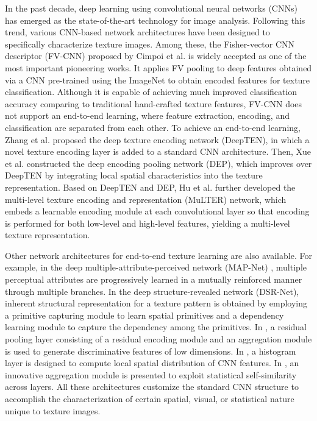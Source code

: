 \documentclass{aci}
\numberwithin{equation}{section}
\begin{document}
In the past decade, deep learning using convolutional neural networks (CNNs)
\cite{krizhevsky_imagenet_2017} has emerged as the state-of-the-art technology
for image analysis. Following this trend, various CNN-based network
architectures have been designed to specifically characterize texture images.
Among these, the Fisher-vector CNN descriptor (FV-CNN) proposed by Cimpoi et al.
\cite{cimpoi_describing_2014} is widely accepted as one of the most important
pioneering works. It applies FV pooling to deep features obtained via a CNN
pre-trained using the ImageNet \cite{krizhevsky_imagenet_2017} to obtain encoded
features for texture classification. Although it is capable of achieving much
improved classification accuracy comparing to traditional hand-crafted texture
features, FV-CNN does not support an end-to-end learning, where feature
extraction, encoding, and classification are separated from each other. To
achieve an end-to-end learning, Zhang et al. \cite{zhang_visual_2018} proposed
the deep texture encoding network (DeepTEN), in which a novel texture encoding
layer is added to a standard CNN architecture. Then, Xue et al.
\cite{xue_deep_2018} constructed the deep encoding pooling network (DEP), which
improves over DeepTEN by integrating local spatial characteristics into the
texture representation. Based on DeepTEN and DEP, Hu et al. \cite{hu_multi_2019}
further developed the multi-level texture encoding and representation (MuLTER)
network, which embeds a learnable encoding module at each convolutional layer so
that encoding is performed for both low-level and high-level features, yielding
a multi-level texture representation.

Other network architectures for end-to-end texture learning are also available.
For example, in the deep multiple-attribute-perceived network (MAP-Net)
\cite{zhai_deep_2019}, multiple perceptual attributes are progressively learned
in a mutually reinforced manner through multiple branches. In the deep
structure-revealed network (DSR-Net)\cite{zhai_deep_2020}, inherent structural
representation for a texture pattern is obtained by employing a primitive
capturing module to learn spatial primitives and a dependency learning module to
capture the dependency among the primitives. In \cite{mao_deep_2021}, a residual
pooling layer consisting of a residual encoding module and an aggregation module
is used to generate discriminative features of low dimensions. In
\cite{peeples_histogram_2021}, a histogram layer is designed to compute local
spatial distribution of CNN features. In \cite{chen_deep_2021}, an innovative
aggregation module is presented to exploit statistical self-similarity across
layers. All these architectures customize the standard CNN structure to
accomplish the characterization of certain spatial, visual, or statistical
nature unique to texture images.
\end{document}
